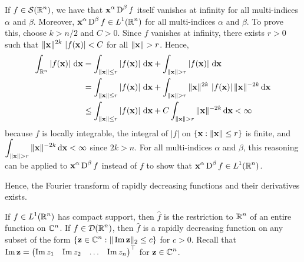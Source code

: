 If $\displaystyle f \in \mathcal{S}(\mathbb{R}^n)$, we have that
$\displaystyle \mathbf{x}^\alpha \operatorname{D}^\beta f$ itself vanishes at infinity
for all multi-indices $\alpha$ and $\beta$.
Moreover, $\displaystyle \mathbf{x}^\alpha \operatorname{D}^\beta f \in L^1(\mathbb{R}^n)$
for all multi-indices $\alpha$ and $\beta$.  To prove this, choose
$k > n/2$ and $C>0$.  Since $f$ vanishes at infinity, there exists $r>0$
such that
$\displaystyle \|\mathbf{x}\|^{2k}\, \left| f(\mathbf{x}) \right| < C$ for
all $\|\mathbf{x}\| > r$.  Hence,
\begin{align*}
\int_{\RR^n} \left| f(\VEC{x})\right| \dx{\VEC{x}} &=
\int_{\|\VEC{x}\|\leq r} \left| f(\VEC{x})\right| \dx{\VEC{x}} +
\int_{\|\VEC{x}\|> r} \left| f(\VEC{x})\right| \dx{\VEC{x}} \\
&= \int_{\|\VEC{x}\|\leq r} \left| f(\VEC{x})\right| \dx{\VEC{x}} +
\int_{\|\VEC{x}\|> r} \|\VEC{x}\|^{2k}\,\left| f(\VEC{x})\right|
\|\VEC{x}\|^{-2k} \dx{\VEC{x}} \\
&\leq \int_{\|\VEC{x}\|\leq r} \left| f(\VEC{x})\right| \dx{\VEC{x}} +
C \int_{\|\VEC{x}\|> r} \|\VEC{x}\|^{-2k} \dx{\VEC{x}} < \infty
\end{align*}
because $f$ is locally integrable, the integral of $|f|$ on
$\{ \mathbf{x} : \|\mathbf{x}\| \leq r \}$ is finite, and\\
$\displaystyle \int_{\|\VEC{x}\|> r} \|\VEC{x}\|^{-2k} \dx{\VEC{x}} < \infty$
since $2k >n$.  For all multi-indices $\alpha$ and $\beta$, this
reasoning can be applied to
$\displaystyle \mathbf{x}^\alpha \operatorname{D}^\beta f$ instead of $f$ to
show that $\displaystyle \mathbf{x}^\alpha \operatorname{D}^\beta f \in L^1(\mathbb{R}^n)$.

Hence, the Fourier transform of rapidly decreasing functions and their
derivatives exists.

\begin{prop} \label{distr_four_f}
If $\displaystyle f \in L^1(\mathbb{R}^n)$ has compact support, then $\hat{f}$ is the
restriction to $\displaystyle \mathbb{R}^n$ of an entire function on
$\displaystyle \mathbb{C}^n$.  If
$\displaystyle f\in \mathcal{D}(\mathbb{R}^n)$, then $\hat{f}$ is a rapidly decreasing
function on any subset of the form
$\displaystyle \left\{ \mathbf{z}\in \mathbb{C}^n : \| \operatorname{Im} \mathbf{z} \|_2 \leq c \right\}$ 
for $c>0$.  Recall that
$\displaystyle \operatorname{Im} \mathbf{z} =
\begin{pmatrix} \operatorname{Im} z_1 & \operatorname{Im} z_2 & \ldots & \operatorname{Im} z_n \end{pmatrix}^\top$
for $\displaystyle \mathbf{z} \in \mathbb{C}^n$.
\end{prop}

